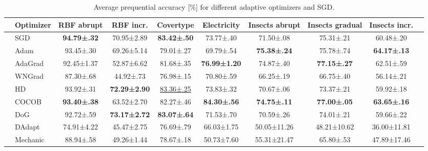 \documentclass[letterpaper]{article} %
\begin{document}
\begin{table}[h]
	\centering
	\small
	\begin{tabular}{llcccccccc}
		\toprule
		                                                   & Optimizer & RBF abrupt          & RBF incr.            & Covertype             & Electricity          & Insects abrupt      & Insects gradual     & Insects incr.       \\
		\midrule
		\multirow{5}{*}{\rotatebox[origin=c]{90}{Tuned}}   & SGD       & \bfseries 94.79±.32 & 70.95±2.89           & \bfseries 83.42±.50   & 73.77±.40            & 71.50±.08           & 75.31±.21           & 60.48±.20           \\
		                                                   & Adam      & 93.45±.30           & 69.26±5.14           & 79.01±.27             & 69.79±.54            & \bfseries 75.38±.24 & 75.78±.74           & \bfseries 64.17±.13 \\
		                                                   & AdaGrad   & 92.45±1.37          & 52.87±6.62           & 81.68±.35             & \bfseries 76.99±1.20 & 74.87±.40           & \bfseries 77.15±.27 & 62.51±.59           \\
		                                                   & WNGrad    & 87.30±.68           & 44.92±.73            & 76.98±.15             & 70.80±.59            & 66.25±.19           & 66.75±.40           & 56.14±.21           \\
		                                                   & HD        & 93.92±.31           & \bfseries 72.29±2.90 & \underline{83.36±.25} & 73.83±.32            & 70.67±.06           & 73.37±.21           & 59.92±.18           \\ \midrule
		\multirow{4}{*}{\rotatebox[origin=c]{90}{LR-Free}} & COCOB     & \bfseries 93.40±.38 & 63.52±2.70           & 82.27±.46             & \bfseries 84.30±.56  & \bfseries 74.75±.11 & \bfseries 77.00±.05 & \bfseries 63.65±.16 \\
		                                                   & DoG       & 92.72±.59           & \bfseries 73.17±2.72 & \bfseries 83.07±.64   & 71.53±.70            & 70.59±.26           & 74.01±.21           & 59.66±.22           \\
		                                                   & DAdapt    & 74.91±4.22          & 45.47±2.75           & 76.69±.79             & 66.03±1.75           & 50.05±11.26         & 48.21±10.62         & 36.00±11.81         \\
		                                                   & Mechanic  & 88.94±.58           & 49.26±1.44           & 78.67±.18             & 50.73±7.60           & 55.31±21.47         & 65.80±.53           & 47.89±17.46         \\
		\bottomrule
	\end{tabular}
	\caption{Average prequential accuracy [\%] for different adaptive optimizers and SGD.}
	\label{tab:results_adaptive_optims}
\end{table}
\end{document}
